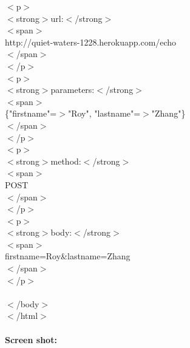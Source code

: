 \documentclass{article}
\begin{document}
			  $<$p$>$\\
			\indent\indent
			    $<$strong$>$url:$<$/strong$>$\\
			\indent\indent
			    $<$span$>$\\
			\indent\indent\indent
			      http://quiet-waters-1228.herokuapp.com/echo\\
			\indent\indent
			    $<$/span$>$\\
			\indent
			  $<$/p$>$\\
			\indent
			  $<$p$>$\\
			\indent\indent
			    $<$strong$>$parameters:$<$/strong$>$\\
			\indent\indent
			    $<$span$>$\\
			\indent\indent\indent
			      \{"firstname"=$>$"Roy", "lastname"=$>$"Zhang"\}\\
			\indent\indent
			    $<$/span$>$\\
			\indent
			  $<$/p$>$\\
			\indent
			  $<$p$>$\\
			\indent\indent
			    $<$strong$>$method:$<$/strong$>$\\
			\indent\indent
			    $<$span$>$\\
			\indent\indent\indent
			      POST\\
			\indent\indent
			    $<$/span$>$\\
			\indent
			  $<$/p$>$\\
			\indent
			  $<$p$>$\\
			\indent\indent
			    $<$strong$>$body:$<$/strong$>$\\
			\indent\indent
			    $<$span$>$\\
			\indent\indent\indent
			      firstname=Roy\&lastname=Zhang\\
			\indent\indent
			    $<$/span$>$\\
			\indent
			  $<$/p$>$\\\\
			$<$/body$>$\\
			$<$/html$>$\\\\
		\textbf{Screen shot:}\\
		\\\\
\end{document}
